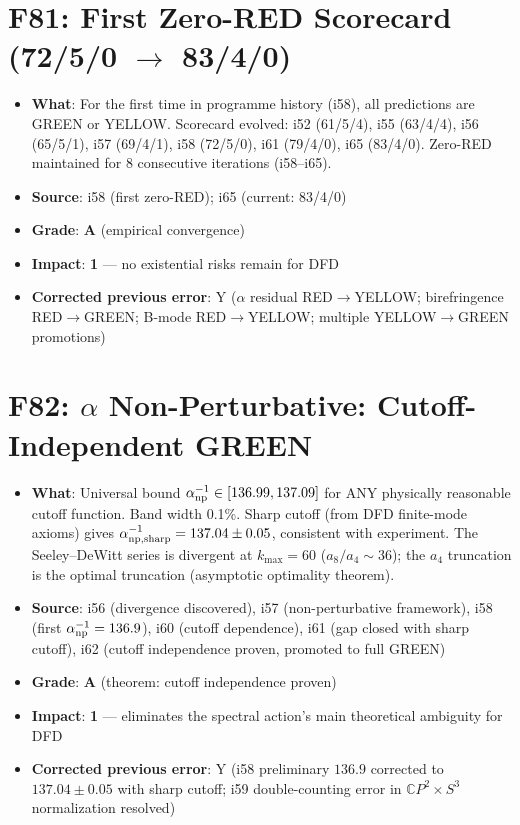 \documentclass[11pt,a4paper]{article}
\newcommand{\grade}[1]{\textbf{#1}}
\newcommand{\impact}[1]{\textbf{#1}}
\begin{document}
\section{F81: First Zero-RED Scorecard (72/5/0 $\to$ 83/4/0)}
\begin{itemize}[nosep]
\item \textbf{What}: For the first time in programme history (i58), all predictions are GREEN or YELLOW. Scorecard evolved: i52 (61/5/4), i55 (63/4/4), i56 (65/5/1), i57 (69/4/1), i58 (72/5/0), i61 (79/4/0), i65 (83/4/0). Zero-RED maintained for 8 consecutive iterations (i58--i65).
\item \textbf{Source}: i58 (first zero-RED); i65 (current: 83/4/0)
\item \textbf{Grade}: \grade{A} (empirical convergence)
\item \textbf{Impact}: \impact{1} --- no existential risks remain for DFD
\item \textbf{Corrected previous error}: Y ($\alpha$ residual RED$\to$YELLOW; birefringence RED$\to$GREEN; B-mode RED$\to$YELLOW; multiple YELLOW$\to$GREEN promotions)
\end{itemize}

\section{F82: $\alpha$ Non-Perturbative: Cutoff-Independent GREEN}
\begin{itemize}[nosep]
\item \textbf{What}: Universal bound $\alpha^{-1}_{\rm np} \in [136.99, 137.09]$ for ANY physically reasonable cutoff function. Band width 0.1\%. Sharp cutoff (from DFD finite-mode axioms) gives $\alpha^{-1}_{\rm np,sharp} = 137.04 \pm 0.05$, consistent with experiment. The Seeley--DeWitt series is divergent at $k_{\max} = 60$ ($a_8/a_4 \sim 36$); the $a_4$ truncation is the optimal truncation (asymptotic optimality theorem).
\item \textbf{Source}: i56 (divergence discovered), i57 (non-perturbative framework), i58 (first $\alpha^{-1}_{\rm np} = 136.9$), i60 (cutoff dependence), i61 (gap closed with sharp cutoff), i62 (cutoff independence proven, promoted to full GREEN)
\item \textbf{Grade}: \grade{A} (theorem: cutoff independence proven)
\item \textbf{Impact}: \impact{1} --- eliminates the spectral action's main theoretical ambiguity for DFD
\item \textbf{Corrected previous error}: Y (i58 preliminary $136.9$ corrected to $137.04 \pm 0.05$ with sharp cutoff; i59 double-counting error in $\mathbb{C}P^2 \times S^3$ normalization resolved)
\end{itemize}
\end{document}
